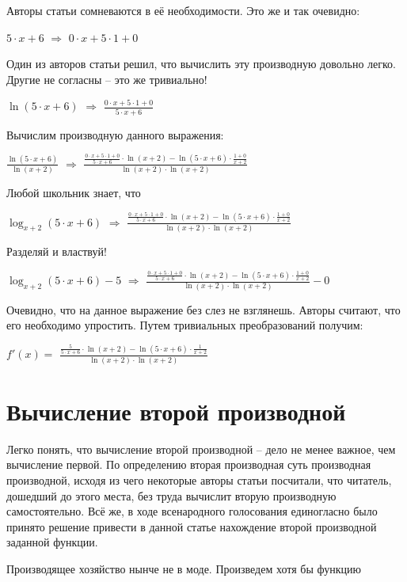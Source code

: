 \documentclass{article}
\begin{document}
Авторы статьи сомневаются в её необходимости. Это же и так очевидно:

$5 \cdot x + 6$ $\Rightarrow$ $0 \cdot x + 5 \cdot 1 + 0$

Один из авторов статьи решил, что вычислить эту производную довольно легко. Другие не согласны -- это же тривиально!

$ \ln (5 \cdot x + 6)$ $\Rightarrow$ $\frac{0 \cdot x + 5 \cdot 1 + 0}{5 \cdot x + 6}$

Вычислим производную данного выражения:

$\frac{ \ln (5 \cdot x + 6)}{ \ln (x + 2)}$ $\Rightarrow$ $\frac{\frac{0 \cdot x + 5 \cdot 1 + 0}{5 \cdot x + 6} \cdot  \ln (x + 2) -  \ln (5 \cdot x + 6) \cdot \frac{1 + 0}{x + 2}}{ \ln (x + 2) \cdot  \ln (x + 2)}$

Любой школьник знает, что

$\log_{x + 2}(5 \cdot x + 6)$ $\Rightarrow$ $\frac{\frac{0 \cdot x + 5 \cdot 1 + 0}{5 \cdot x + 6} \cdot  \ln (x + 2) -  \ln (5 \cdot x + 6) \cdot \frac{1 + 0}{x + 2}}{ \ln (x + 2) \cdot  \ln (x + 2)}$

Разделяй и властвуй!

$\log_{x + 2}(5 \cdot x + 6) - 5$ $\Rightarrow$ $\frac{\frac{0 \cdot x + 5 \cdot 1 + 0}{5 \cdot x + 6} \cdot  \ln (x + 2) -  \ln (5 \cdot x + 6) \cdot \frac{1 + 0}{x + 2}}{ \ln (x + 2) \cdot  \ln (x + 2)} - 0$

Очевидно, что на данное выражение без слез не взглянешь. Авторы считают, что его необходимо упростить. Путем тривиальных преобразований получим:

$f'(x) = $ $\frac{\frac{5}{5 \cdot x + 6} \cdot  \ln (x + 2) -  \ln (5 \cdot x + 6) \cdot \frac{1}{x + 2}}{ \ln (x + 2) \cdot  \ln (x + 2)}$

\section{Вычисление второй производной}

Легко понять, что вычисление второй производной -- дело не менее важное, чем вычисление первой. По определению вторая производная суть производная производной, исходя из чего некоторые авторы статьи посчитали, что читатель, дошедший до этого места, без труда вычислит вторую производную самостоятельно. Всё же, в ходе всенародного голосования единогласно было принято решение привести в данной статье нахождение второй производной заданной функции.

Производящее хозяйство нынче не в моде. Произведем хотя бы функцию
\end{document}
